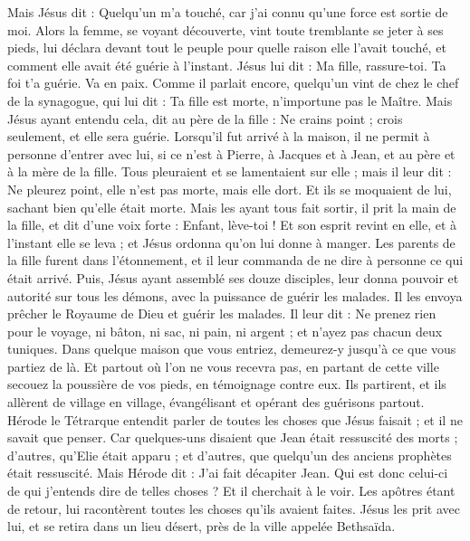 \begin{multicols}{2}
Mais Jésus dit : Quelqu’un m'a touché, car j'ai connu qu'une force est sortie de moi.
Alors la femme, se voyant découverte, vint toute tremblante se jeter à ses pieds, lui déclara devant tout le peuple pour quelle raison elle l'avait touché, et comment elle avait été guérie à l’instant.
Jésus lui dit : Ma fille, rassure-toi. Ta foi t'a guérie. Va en paix.
Comme il parlait encore, quelqu'un vint de chez le chef de la synagogue, qui lui dit : Ta fille est morte, n’importune pas le Maître.
Mais Jésus ayant entendu cela, dit au père de la fille : Ne crains point ; crois seulement, et elle sera guérie.
Lorsqu’il fut arrivé à la maison, il ne permit à personne d’entrer avec lui, si ce n’est à Pierre, à Jacques et à Jean, et au père et à la mère de la fille.
Tous pleuraient et se lamentaient sur elle ; mais il leur dit : Ne pleurez point, elle n'est pas morte, mais elle dort.
Et ils se moquaient de lui, sachant bien qu'elle était morte.
Mais les ayant tous fait sortir, il prit la main de la fille, et dit d’une voix forte : Enfant, lève-toi !
Et son esprit revint en elle, et à l’instant elle se leva ; et Jésus ordonna qu'on lui donne à manger.
Les parents de la fille furent dans l’étonnement, et il leur commanda de ne dire à personne ce qui était arrivé.
\VerseOne{}Puis, Jésus ayant assemblé ses douze disciples, leur donna pouvoir et autorité sur tous les démons, avec la puissance de guérir les malades.
Il les envoya prêcher le Royaume de Dieu et guérir les malades.
Il leur dit : Ne prenez rien pour le voyage, ni bâton, ni sac, ni pain, ni argent ; et n'ayez pas chacun deux tuniques.
Dans quelque maison que vous entriez, demeurez-y jusqu'à ce que vous partiez de là.
Et partout où l'on ne vous recevra pas, en partant de cette ville secouez la poussière de vos pieds, en témoignage contre eux.
Ils partirent, et ils allèrent de village en village, évangélisant et opérant des guérisons partout.
Hérode le Tétrarque entendit parler de toutes les choses que Jésus faisait ; et il ne savait que penser. Car quelques-uns disaient que Jean était ressuscité des morts ;
d’autres, qu'Elie était apparu ; et d'autres, que quelqu'un des anciens prophètes était ressuscité.
Mais Hérode dit : J'ai fait décapiter Jean. Qui est donc celui-ci de qui j'entends dire de telles choses ? Et il cherchait à le voir.
Les apôtres étant de retour, lui racontèrent toutes les choses qu'ils avaient faites. Jésus les prit avec lui, et se retira dans un lieu désert, près de la ville appelée Bethsaïda.

\end{multicols}
